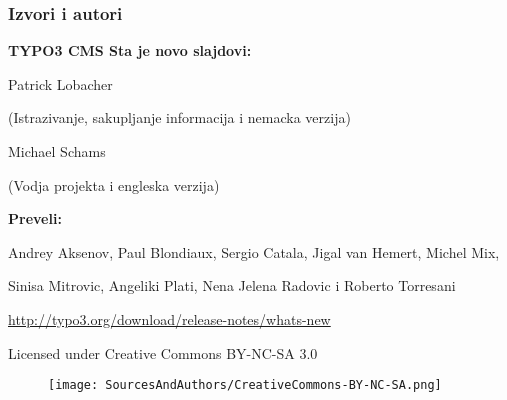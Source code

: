 \begin{frame}[fragile]
	\frametitle{Izvori i autori}

	\vspace{-0.6cm}

	\centerline{\textbf{TYPO3 CMS Sta je novo slajdovi:}}

	\begin{center}
		\smaller
			\centerline{Patrick Lobacher}
			\centerline{(Istrazivanje, sakupljanje informacija i nemacka verzija)}
			\vspace{0.1cm}
			\centerline{Michael Schams}
			\centerline{(Vodja projekta i engleska verzija)}
		\normalsize
	\end{center}
	\vspace{-0.6cm}
	\begin{center}
		\smaller
			\centerline{\textbf{Preveli:}}
			\centerline{Andrey Aksenov, Paul Blondiaux, Sergio Catala, Jigal van Hemert, Michel Mix,}
			\centerline{Sinisa Mitrovic, Angeliki Plati, Nena Jelena Radovic i Roberto Torresani}
		\normalsize
	\end{center}
	\vspace{-0.6cm}
	\smaller\begin{center}\url{http://typo3.org/download/release-notes/whats-new}\end{center}\normalsize

	\smaller\begin{center}Licensed under Creative Commons BY-NC-SA 3.0\end{center}\normalsize
	\begin{figure}\vspace*{-0.3cm}
		\texttt{[image: SourcesAndAuthors/CreativeCommons-BY-NC-SA.png]}
	\end{figure}

\end{frame}

